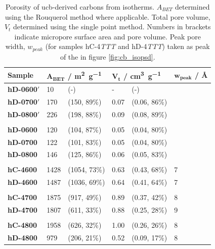 \begin{table}[b!]
    \centering
    \caption{Porosity of \acrshort{ucb}-derived carbons from  isotherms. $A_{BET}$ determined using the Rouquerol method where applicable. Total pore volume, $V_t$ determined using the single point method. Numbers in brackets indicate micropore surface area and pore volume. Peak pore width, $w_{peak}$ (for samples hC-4\textit{TTT} and hD-4\textit{TTT}) taken as peak of the  in figure \ref{fig:cb_isopsd}.}
    \label{tb:cb_porosity}
    \begin{tabularx}{0.9\textwidth}{lllllll}
    \toprule
        \textbf{Sample} & \multicolumn{2}{l}{$\mathbf{A_{BET}}$ \textbf{/ \unit[detect-weight]{\metre\squared\per\gram}}}  & \multicolumn{2}{l}{$\mathbf{V_t}$ \textbf{/ \unit[detect-weight]{\cm\cubed\per\gram}}} & \multicolumn{2}{l}{$\mathbf{w_{peak}}$ \textbf{/ \unit{\angstrom}}} \\
    \midrule
        \textbf{hD-0600$'$} & 10 & (-) & - & (-) & \\
        \textbf{hD-0700$'$} & 170 & (150, 89\%) & 0.07 & (0.06, 86\%) \\
        \textbf{hD-0800$'$} & 226 & (198, 88\%) & 0.09 & (0.08, 89\%) \\
        & & & \\
        \textbf{hD-0600} & 120 & (104, 87\%) & 0.05 & (0.04, 80\%) & \\
        \textbf{hD-0700} & 122 &  (101, 83\%) & 0.05 & (0.04, 80\%) & \\
        \textbf{hD-0800} & 146 & (125, 86\%) & 0.06 & (0.05, 83\%) \\
        & & & \\
        \textbf{hC-4600} & 1428 & (1054, 73\%) & 0.63 & (0.43, 68\%) & 7  \\
        \textbf{hD-4600} & 1487 & (1036, 69\%) & 0.64 & (0.41, 64\%) & 7 \\
        & & & \\
        \textbf{hC-4700} & 1875 & (917, 49\%) & 0.89 & (0.37, 42\%) & 8 \\
        \textbf{hD-4700} & 1807 & (611, 33\%) & 0.88 & (0.25, 28\%) & 9  \\
        & & & \\
        \textbf{hC-4800} & 1958 & (626, 32\%) & 1.00 & (0.26, 26\%) & 8 \\
        \textbf{hD-4800} & 979 & (206, 21\%) & 0.52 & (0.09, 17\%) &  8 \\
    \bottomrule
    \end{tabularx}
\end{table}

